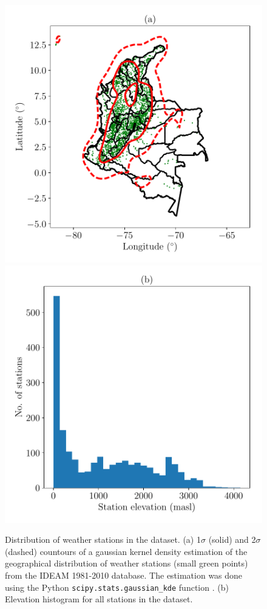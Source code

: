 \documentclass[a4paper,fleqn,usenatbib]{mnras}
\begin{document}
\begin{figure}
\begin{center}
\includegraphics[scale=0.5]{totmap.pdf}
\includegraphics[scale=0.5]{elev.pdf}
\caption{Distribution of weather stations in the dataset. (a) 1$\sigma$ (solid) and 2$\sigma$ (dashed) countours of a gaussian kernel density estimation of the geographical distribution of weather stations (small green points) from the IDEAM 1981-2010 database. The estimation was done using the Python \texttt{scipy.stats.gaussian\_kde}  function \citep{scipy}. (b) Elevation histogram for all stations in the dataset.}\label{totmap}
\end{center}
\end{figure}
\end{document}

